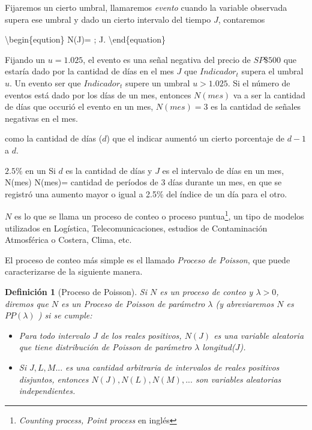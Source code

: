 \documentclass[
  oneside]{article}
\newtheorem{definition}{Definición}[section]
\begin{document}
Fijaremos un cierto umbral, llamaremos \textit{evento} cuando la
variable observada supera ese umbral y dado un cierto intervalo del
tiempo \(J\), contaremos

\textbackslash begin\{eqution\} N(J)=
; J.
\textbackslash end\{equation\}

Fijando un \(u=1.025\), el evento es una señal negativa del precio de
\(SP\$500\) que estaría dado por la cantidad de días en el mes \(J\) que
\(Indicador_t\) supera el umbral \(u\). Un evento ser que
\(Indicador_t\) supere un umbral \(u>1.025\). Si el número de eventos
está dado por los días de un mes, entonces \(N(mes)\) va a ser la
cantidad de días que occurió el evento en un mes, \(N(mes)=3\) es la
cantidad de señales negativas en el mes.

como la cantidad de días (\(d\)) que el indicar aumentó un cierto
porcentaje de \(d-1\) a \(d\).

\(2.5\%\) en un Si \(d\) es la cantidad de días y \(J\) es el intervalo
de días en un mes, N(mes) N(mes)= cantidad de períodos de 3 días durante
un mes, en que se registró una aumento mayor o igual a 2.5\% del índice
de un día para el otro.

\(N\) es lo que se llama un proceso de conteo o proceso
puntua\footnote{\textit{Counting process, Point process} en inglés}, un
tipo de modelos utilizados en Logística, Telecomunicaciones, estudios de
Contaminación Atmosférica o Costera, Clima, etc.

El proceso de conteo más simple es el llamado
\textit{Proceso de Poisson}, que puede caracterizarse de la siguiente
manera.

\begin{definition}[Proceso de Poisson]\label{def:1}
Si $N$ es un proceso de conteo y $\lambda>0$, diremos que $N$ es un Proceso de Poisson de parámetro $\lambda$ (y abreviaremos $N$ es $PP(\lambda)$ ) si se cumple:
\begin{itemize}
\item[a)] Para todo intervalo $J$ de los reales positivos, $N(J)$ es una variable aleatoria que tiene distribución de Poisson de parámetro $\lambda$ longitud($J$).
\item[b)] Si $J, L, M...$ es una cantidad arbitraria de intervalos de reales positivos \textit{disjuntos}, entonces $N(J), N(L), N(M),...$ son variables aleatorias independientes.
\end{itemize}
\end{definition}
\end{document}
